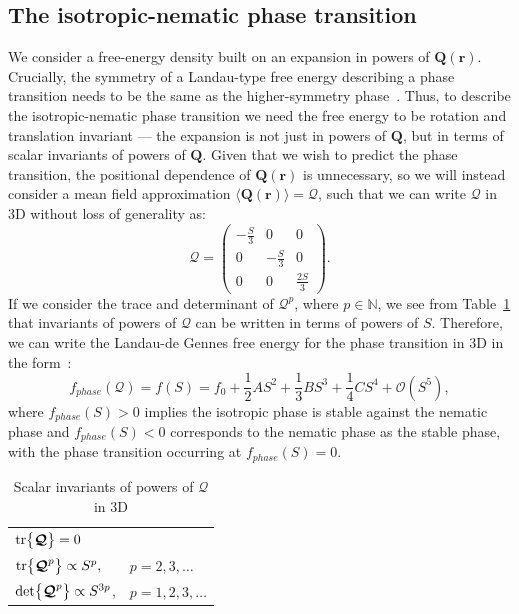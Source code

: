\subsection{The isotropic-nematic phase transition}
We consider a free-energy density built on an expansion in powers of $\mathbf{Q}(\mathbf{r})$.
Crucially, the symmetry of a Landau-type free energy describing a phase transition needs to be the same as the higher-symmetry phase~\cite{RN33,RN175}.
Thus, to describe the isotropic-nematic phase transition we need the free energy to be rotation and translation invariant --- the expansion is not just in powers of $\mathbf{Q}$, but in terms of scalar invariants of powers of $\mathbf{Q}$.
Given that we wish to predict the phase transition, the positional dependence of $\mathbf{Q}(\mathbf{r})$ is unnecessary, so we will instead consider a mean field approximation $\langle \mathbf{Q}(\mathbf{r}) \rangle = \bm{\mathcal{Q}}$, such that we can write $\bm{\mathcal{Q}}$ in 3D without loss of generality as:
\begin{equation}
  \bm{\mathcal{Q}} =
    \begin{pmatrix}
        -\frac{S}{3} & 0 & 0 \\
        0 & -\frac{S}{3} & 0 \\
        0 & 0 & \frac{2S}{3}
    \end{pmatrix}.
\end{equation}
If we consider the trace and determinant of $\bm{\mathcal{Q}}^p$, where $p \in \mathbb{N}$, we see from Table~\ref{t:2-powersQ} that invariants of powers of $\bm{\mathcal{Q}}$ can be written in terms of powers of $S$.
Therefore, we can write the Landau-de Gennes free energy for the phase transition in 3D in the form~\cite{RN33,RN175}:
\begin{equation}
  f_{phase}(\bm{\mathcal{Q}}) = f(S) = f_0 + \frac{1}{2}A S^2 + \frac{1}{3}B S^3 + \frac{1}{4}C S^4 + \mathcal{O} \left (S^5 \right ),\label{e:2-LdGTransGeneral}
\end{equation}
where $f_{phase}(S) > 0$ implies the isotropic phase is stable against the nematic phase and $f_{phase}(S) < 0$ corresponds to the nematic phase as the stable phase, with the phase transition occurring at $f_{phase}(S) = 0$.
\begin{table}[t]
  \centering
  \caption{Scalar invariants of powers of $\bm{\mathcal{Q}}$ in 3D}
  \label{t:2-powersQ}
  \begin{tabular}{|l l|}
    \hline
    $\textup{tr} \big \{ \bm{\mathcal{Q}} \big \} = 0$ & \\
    $\textup{tr} \big \{ \bm{\mathcal{Q}}^p \big \} \propto S^p,$ & $p = 2,3, \dots$ \\
    $\textup{det} \big \{ \bm{\mathcal{Q}}^p \big \} \propto S^{3p}$, & $p = 1,2,3,\dots$ \\
    \hline
  \end{tabular}
\end{table}

